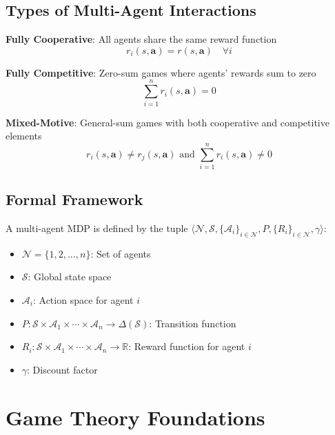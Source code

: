 \subsection{Types of Multi-Agent Interactions}

\textbf{Fully Cooperative}: All agents share the same reward function
\begin{equation}
r_i(s, \mathbf{a}) = r(s, \mathbf{a}) \quad \forall i
\end{equation}

\textbf{Fully Competitive}: Zero-sum games where agents' rewards sum to zero
\begin{equation}
\sum_{i=1}^n r_i(s, \mathbf{a}) = 0
\end{equation}

\textbf{Mixed-Motive}: General-sum games with both cooperative and competitive elements
\begin{equation}
r_i(s, \mathbf{a}) \neq r_j(s, \mathbf{a}) \text{ and } \sum_{i=1}^n r_i(s, \mathbf{a}) \neq 0
\end{equation}

\subsection{Formal Framework}

A multi-agent MDP is defined by the tuple $\langle \mathcal{N}, \mathcal{S}, \{\mathcal{A}_i\}_{i \in \mathcal{N}}, P, \{R_i\}_{i \in \mathcal{N}}, \gamma \rangle$:

\begin{itemize}
    \item $\mathcal{N} = \{1, 2, \ldots, n\}$: Set of agents
    \item $\mathcal{S}$: Global state space
    \item $\mathcal{A}_i$: Action space for agent $i$
    \item $P: \mathcal{S} \times \mathcal{A}_1 \times \cdots \times \mathcal{A}_n \to \Delta(\mathcal{S})$: Transition function
    \item $R_i: \mathcal{S} \times \mathcal{A}_1 \times \cdots \times \mathcal{A}_n \to \mathbb{R}$: Reward function for agent $i$
    \item $\gamma$: Discount factor
\end{itemize}

\section{Game Theory Foundations}

